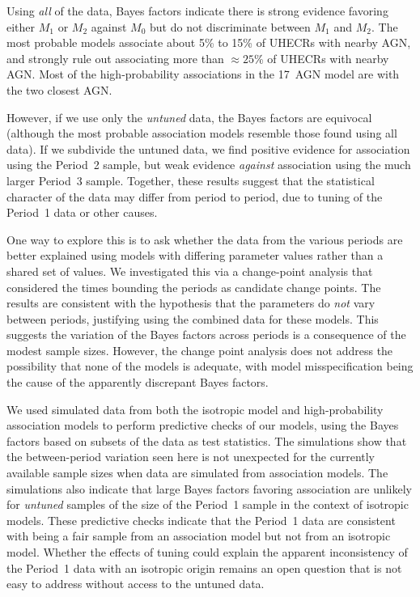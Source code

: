 Using {\em all} of the data, Bayes factors indicate there is strong evidence
favoring either $M_1$ or $M_2$ against $M_0$ but do not discriminate between
$M_1$ and $M_2$.  The most probable models associate about 5\% to 15\% of
UHECRs with nearby AGN, and strongly rule out associating more than
$\approx 25$\% of UHECRs with nearby AGN.  Most of the high-probability
associations in the 17~AGN model are with the two closest AGN.

However, if we use only the {\em untuned} data, the Bayes factors are
equivocal (although the most probable association models resemble those
found using all data).  If we subdivide the untuned data, we find positive
evidence for association using the Period~2 sample, but weak evidence {\em
against} association using the much larger Period~3 sample.  Together, these
results suggest that the statistical character of the data may differ from
period to period, due to tuning of the Period~1 data or other causes.

One way to explore this is to ask whether the data from the various periods
are better explained using models with differing parameter values rather
than a shared set of values.  We investigated this via a change-point
analysis that considered the times bounding the periods as candidate change
points.  The results are consistent with the hypothesis that the parameters
do {\em not} vary between periods, justifying using the combined data for
these models.  This suggests the variation of the Bayes factors across
periods is a consequence of the modest sample sizes.  However, the
change point analysis does not address the possibility that none of the
models is adequate, with model misspecification being the cause of the
apparently discrepant Bayes factors.

We used simulated data from both the isotropic model and
high-probability association models to perform predictive checks of our
models, using the Bayes factors based on subsets of the data as test
statistics.  The simulations show that the between-period variation seen
here is not unexpected for the currently available sample sizes when data are
simulated from association models.  The simulations also indicate that large
Bayes factors favoring association are unlikely for {\em untuned} samples of
the size of the Period~1 sample in the context of isotropic models.  These
predictive checks indicate that the Period~1 data are consistent with being
a fair sample from an association model but not from an isotropic model.
Whether the effects of tuning could explain the apparent inconsistency of
the Period~1 data with an isotropic origin remains an open question that is
not easy to address without access to the untuned data.


